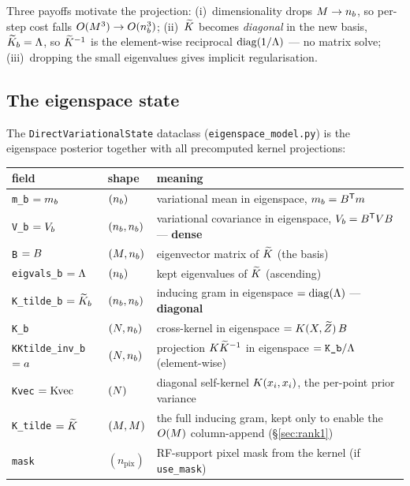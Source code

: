 Three payoffs motivate the projection: (i)~dimensionality drops $M\to n_{b}$, so
per-step cost falls $O(M^3)\to O(n_{b}^3)$; (ii)~$\widetilde{K}$ becomes
\emph{diagonal} in the new basis, $\widetilde{K}_{b}=\Lambda$, so $\widetilde{K}^{-1}$ is the
element-wise reciprocal $\operatorname{diag}(1/\Lambda)$ --- no matrix solve; (iii)~dropping the
small eigenvalues gives implicit regularisation.

\subsection{The eigenspace state}\label{sec:eigstate}

The \texttt{DirectVariationalState} dataclass (\texttt{eigenspace\_model.py}) is
the eigenspace posterior together with all precomputed kernel projections:

\begin{center}\small
\begin{tabular}{@{}l l >{\raggedright\arraybackslash}p{8.6cm}@{}}
\toprule
field & shape & meaning \\
\midrule
\texttt{m\_b} $=m_{b}$ & $(n_{b})$ & variational mean in eigenspace, $m_{b}=B^{\mathsf{T}}m$ \\
\texttt{V\_b} $=V_{b}$ & $(n_{b},n_{b})$ & variational covariance in eigenspace, $V_{b}=B^{\mathsf{T}}VB$ --- \textbf{dense} \\
\texttt{B} $=B$ & $(M,n_{b})$ & eigenvector matrix of $\widetilde{K}$ (the basis) \\
\texttt{eigvals\_b} $=\Lambda$ & $(n_{b})$ & kept eigenvalues of $\widetilde{K}$ (ascending) \\
\texttt{K\_tilde\_b} $=\widetilde{K}_{b}$ & $(n_{b},n_{b})$ & inducing gram in eigenspace $=\operatorname{diag}(\Lambda)$ --- \textbf{diagonal} \\
\texttt{K\_b} & $(N,n_{b})$ & cross-kernel in eigenspace $=K(X,\widetilde{Z})\,B$ \\
\texttt{KKtilde\_inv\_b} $=a$ & $(N,n_{b})$ & projection $K\widetilde{K}^{-1}$ in eigenspace $=\texttt{K\_b}/\Lambda$ (element-wise) \\
\texttt{Kvec} $=\mathrm{Kvec}$ & $(N)$ & diagonal self-kernel $K(x_i,x_i)$, the per-point prior variance \\
\texttt{K\_tilde} $=\widetilde{K}$ & $(M,M)$ & the full inducing gram, kept only to enable the $O(M)$ column-append (\S\ref{sec:rank1}) \\
\texttt{mask} & $(n_{\text{pix}})$ & RF-support pixel mask from the kernel (if \texttt{use\_mask}) \\
\bottomrule
\end{tabular}
\end{center}

